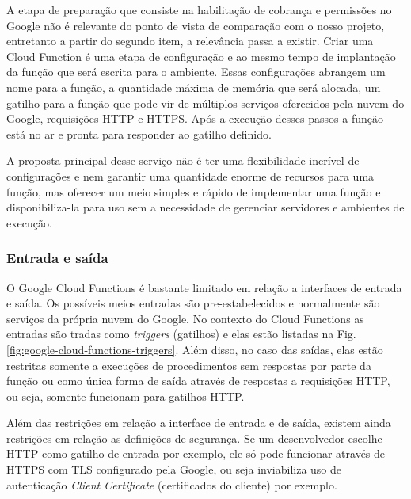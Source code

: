 A etapa de preparação que consiste na habilitação de cobrança e permissões no
Google não é relevante do ponto de vista de comparação com o nosso projeto,
entretanto a partir do segundo item, a relevância passa a existir.
Criar uma Cloud Function é uma etapa de configuração e ao mesmo tempo de
implantação da função que será escrita para o ambiente. Essas configurações
abrangem um nome para a função, a quantidade máxima de memória que será
alocada, um gatilho para a função que pode vir de múltiplos serviços oferecidos
pela nuvem do Google, requisições HTTP e HTTPS. Após a execução desses passos a
função está no ar e pronta para responder ao gatilho definido.

\bigskip
A proposta principal desse serviço não é ter uma flexibilidade incrível de
configurações e nem garantir uma quantidade enorme de recursos para uma função,
mas oferecer um meio simples e rápido de implementar uma função e
disponibiliza-la para uso sem a necessidade de gerenciar servidores e ambientes
de execução.

\subsubsection{Entrada e saída}

O Google Cloud Functions é bastante limitado em relação a interfaces de entrada
e saída. Os possíveis meios entradas são pre-estabelecidos e normalmente são
serviços da própria nuvem do Google. No contexto do Cloud Functions as entradas
são tradas como \textit{triggers} (gatilhos) e elas estão listadas na Fig.
\ref{fig:google-cloud-functions-triggers}. Além disso, no caso das saídas, elas
estão restritas somente a execuções de procedimentos sem respostas por parte da
função ou como única forma de saída através de respostas a requisições HTTP, ou
seja, somente funcionam para gatilhos HTTP.

\bigskip
Além das restrições em relação a interface de entrada e de saída, existem ainda
restrições em relação as definições de segurança. Se um desenvolvedor escolhe
HTTP como gatilho de entrada por exemplo, ele só pode funcionar através de
HTTPS com TLS configurado pela Google, ou seja inviabiliza uso de autenticação
\textit{Client Certificate} (certificados do cliente) por exemplo.

